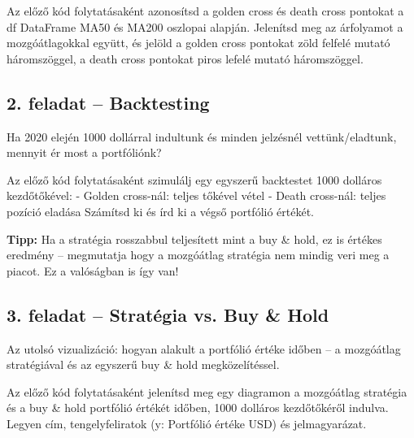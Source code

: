 \documentclass[11pt,a4paper]{article}
\newcommand{\tip}[1]{%
  \vspace{3pt}%
  \begin{tcolorbox}[tipstyle]%
  \textbf{\textcolor{tipborder}{Tipp:}} #1%
  \end{tcolorbox}\vspace{2pt}}
\newcommand{\lbl}[1]{\vspace{6pt}\noindent{\small\bfseries\textcolor{labelcolor}{#1}}\par\smallskip}
\begin{document}
\begin{prompt}
Az előző kód folytatásaként azonosítsd a golden cross és death cross
pontokat a df DataFrame MA50 és MA200 oszlopai alapján.
Jelenítsd meg az árfolyamot a mozgóátlagokkal együtt,
és jelöld a golden cross pontokat zöld felfelé mutató háromszöggel,
a death cross pontokat piros lefelé mutató háromszöggel.
\end{prompt}

\bigskip

\subsection{2. feladat -- Backtesting}

\noindent Ha 2020 elején 1000 dollárral indultunk és minden jelzésnél
vettünk/eladtunk, mennyit ér most a portfóliónk?

\bigskip

\lbl{Feladat:}

\begin{prompt}
Az előző kód folytatásaként szimulálj egy egyszerű backtestet
1000 dolláros kezdőtőkével:
- Golden cross-nál: teljes tőkével vétel
- Death cross-nál: teljes pozíció eladása
Számítsd ki és írd ki a végső portfólió értékét.
\end{prompt}

\tip{Ha a stratégia rosszabbul teljesített mint a buy \& hold,
ez is értékes eredmény -- megmutatja hogy a mozgóátlag stratégia
nem mindig veri meg a piacot. Ez a valóságban is így van!}

\bigskip

\subsection{3. feladat -- Stratégia vs. Buy \& Hold}

\noindent Az utolsó vizualizáció: hogyan alakult a portfólió értéke időben --
a mozgóátlag stratégiával és az egyszerű buy \& hold megközelítéssel.

\bigskip

\lbl{Feladat:}

\begin{prompt}
Az előző kód folytatásaként jelenítsd meg egy diagramon
a mozgóátlag stratégia és a buy \& hold portfólió értékét időben,
1000 dolláros kezdőtőkéről indulva.
Legyen cím, tengelyfeliratok (y: Portfólió értéke USD) és jelmagyarázat.
\end{prompt}
\end{document}
